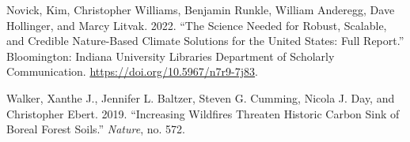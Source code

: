 \documentclass[
  letterpaper,
  DIV=11,
  numbers=noendperiod]{scrreprt}
\newlength{\cslhangindent}
\newlength{\cslentryspacingunit} %
\newenvironment{CSLReferences}[2] %
 {%
  \setlength{\parindent}{0pt}
  \ifodd #1
  \let\oldpar\par
  \def\par{\hangindent=\cslhangindent\oldpar}
  \fi
  \setlength{\parskip}{#2\cslentryspacingunit}
 }%
 {}
\begin{document}

\hypertarget{refs}{}
\begin{CSLReferences}{1}{0}
\leavevmode{}%
Novick, Kim, Christopher Williams, Benjamin Runkle, William Anderegg,
Dave Hollinger, and Marcy Litvak. 2022. {``The Science Needed for
Robust, Scalable, and Credible Nature-Based Climate Solutions for the
United States: Full Report.''} Bloomington: Indiana University Libraries
Department of Scholarly Communication.
\url{https://doi.org/10.5967/n7r9-7j83}.

\leavevmode{}%
Walker, Xanthe J., Jennifer L. Baltzer, Steven G. Cumming, Nicola J.
Day, and Christopher Ebert. 2019. {``Increasing Wildfires Threaten
Historic Carbon Sink of Boreal Forest Soils.''} \emph{Nature}, no. 572.

\end{CSLReferences}
\end{document}
